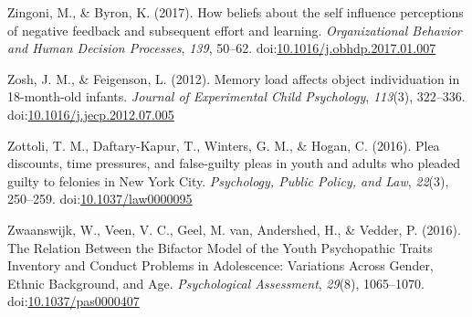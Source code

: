 \documentclass[english,man]{apa6}
\begin{document}
\hypertarget{ref-Zingoni2017}{}
Zingoni, M., \& Byron, K. (2017). How beliefs about the self influence
perceptions of negative feedback and subsequent effort and learning.
\emph{Organizational Behavior and Human Decision Processes}, \emph{139},
50--62.
doi:\href{https://doi.org/10.1016/j.obhdp.2017.01.007}{10.1016/j.obhdp.2017.01.007}

\hypertarget{ref-Zosh2012}{}
Zosh, J. M., \& Feigenson, L. (2012). Memory load affects object
individuation in 18-month-old infants. \emph{Journal of Experimental
Child Psychology}, \emph{113}(3), 322--336.
doi:\href{https://doi.org/10.1016/j.jecp.2012.07.005}{10.1016/j.jecp.2012.07.005}

\hypertarget{ref-Zottoli2016}{}
Zottoli, T. M., Daftary-Kapur, T., Winters, G. M., \& Hogan, C. (2016).
Plea discounts, time pressures, and false-guilty pleas in youth and
adults who pleaded guilty to felonies in New York City.
\emph{Psychology, Public Policy, and Law}, \emph{22}(3), 250--259.
doi:\href{https://doi.org/10.1037/law0000095}{10.1037/law0000095}

\hypertarget{ref-Zwaanswijk2016}{}
Zwaanswijk, W., Veen, V. C., Geel, M. van, Andershed, H., \& Vedder, P.
(2016). The Relation Between the Bifactor Model of the Youth
Psychopathic Traits Inventory and Conduct Problems in Adolescence:
Variations Across Gender, Ethnic Background, and Age.
\emph{Psychological Assessment}, \emph{29}(8), 1065--1070.
doi:\href{https://doi.org/10.1037/pas0000407}{10.1037/pas0000407}
\end{document}
